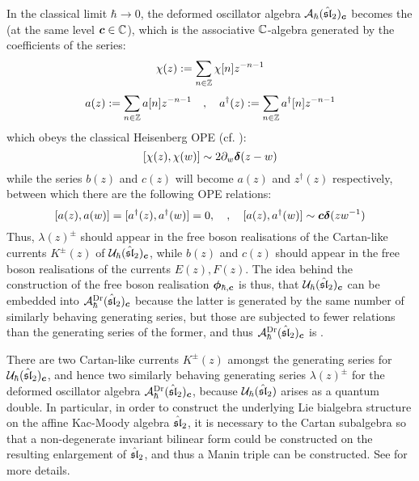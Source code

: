             In the classical limit $\hbar \to 0$, the deformed oscillator algebra $\calA_{\hbar}(\hat{\sl}_2)_{\level}$ becomes the  (at the same level $\level \in \bbC$), which is the associative $\bbC$-algebra generated by the coefficients of the series:
                $$\chi(z) := \sum_{n \in \Z} \chi[n] z^{-n - 1}$$
                $$a(z) := \sum_{n \in \Z} a[n] z^{-n - 1} \quad, \quad a^{\dagger}(z) := \sum_{n \in \Z} a^{\dagger}[n] z^{-n - 1}$$
            which obeys the classical Heisenberg OPE (cf. \cite[Subsection 2.3.2]{frenkel_ben_zvi_vertex_algebras_and_algebraic_curves}):
                \begin{equation} \label{equation: classical_heisenberg_OPE}
                    [\chi(z), \chi(w)] \sim 2 \del_w \1(z - w)
                \end{equation}
            while the series $b(z)$ and $c(z)$ will become $a(z)$ and $z^{\dagger}(z)$ respectively, between which there are the following OPE relations:
                \begin{equation} \label{equation: classical_weyl_OPE}
                    [a(z), a(w)] = [a^{\dagger}(z), a^{\dagger}(w)] = 0, \quad, \quad [a(z), a^{\dagger}(w)] \sim \level \1(zw^{-1})
                \end{equation}
            Thus, $\lambda(z)^{\pm}$ should appear in the free boson realisations of the Cartan-like currents $K^{\pm}(z)$ of $\calU_{\hbar}(\hat{\sl}_2)_{\level}$, while $b(z)$ and $c(z)$ should appear in the free boson realisations of the  currents $E(z), F(z)$. The idea behind the construction of the free boson realisation $\freeboson_{\hbar, \level}$ is thus, that $\calU_{\hbar}(\hat{\sl}_2)_{\level}$ can be embedded into $\calA_{\hbar}^{\current}(\hat{\sl}_2)_{\level}$ because the latter is generated by the same number of similarly behaving generating series, but those are subjected to fewer relations than the generating series of the former, and thus $\calA_{\hbar}^{\current}(\hat{\sl}_2)_{\level}$ is .

            \begin{remark}
                There are two Cartan-like currents $K^{\pm}(z)$ amongst the generating series for $\calU_{\hbar}(\hat{\sl}_2)_{\level}$, and hence two similarly behaving generating series $\lambda(z)^{\pm}$ for the deformed oscillator algebra $\calA_{\hbar}^{\current}(\hat{\sl}_2)_{\level}$, because $\calU_{\hbar}(\hat{\sl}_2)$ arises as a quantum double. In particular, in order to construct the underlying Lie bialgebra structure on the affine Kac-Moody algebra $\hat{\sl}_2$, it is necessary to  the Cartan subalgebra so that a non-degenerate invariant bilinear form could be constructed on the resulting enlargement of $\hat{\sl}_2$, and thus a Manin triple can be constructed. See \cite{etingof_kazhdan_quantisation_6} for more details. 
            \end{remark}

